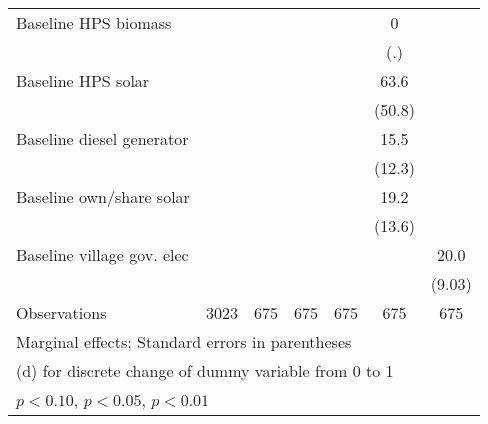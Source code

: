 \begin{table}[htbp]
\begin{tabular*}{1\hsize}{@{\hskip\tabcolsep\extracolsep\fill}l*{6}{c}}
Baseline HPS biomass&                  &                  &                  &                  &        0         &                  \\
                &                  &                  &                  &                  &      (.)         &                  \\
Baseline HPS solar&                  &                  &                  &                  &     63.6         &                  \\
                &                  &                  &                  &                  &   (50.8)         &                  \\
Baseline diesel generator&                  &                  &                  &                  &     15.5         &                  \\
                &                  &                  &                  &                  &   (12.3)         &                  \\
Baseline own/share solar&                  &                  &                  &                  &     19.2         &                  \\
                &                  &                  &                  &                  &   (13.6)         &                  \\
Baseline village gov. elec&                  &                  &                  &                  &                  &     20.0\sym{**} \\
                &                  &                  &                  &                  &                  &   (9.03)         \\
\midrule
Observations    &     3023         &      675         &      675         &      675         &      675         &      675         \\
\bottomrule
\multicolumn{7}{l}{\footnotesize Marginal effects; Standard errors in parentheses}\\
\multicolumn{7}{l}{\footnotesize  (d) for discrete change of dummy variable from 0 to 1}\\
\multicolumn{7}{l}{\footnotesize \sym{*} \(p<0.10\), \sym{**} \(p<0.05\), \sym{***} \(p<0.01\)}\\
\end{tabular*}
\end{table}
